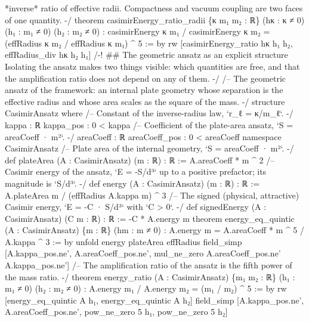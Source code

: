 \documentclass[11pt,a4paper]{article}
\begin{document}
{*inverse* ratio of effective radii.  Compactness and vacuum coupling are two
faces of one quantity. -/
theorem casimirEnergy\_\allowbreak{}ratio\_\allowbreak{}radii \{κ m₁ m₂ : ℝ\} (hκ : κ ≠ 0) (h₁ : m₁ ≠ 0) (h₂ : m₂ ≠ 0) :
    casimirEnergy κ m₁ / casimirEnergy κ m₂ = (effRadius κ m₂ / effRadius κ m₁) \textasciicircum{} 5 := by
  rw [casimirEnergy\_\allowbreak{}ratio hκ h₁ h₂, effRadius\_\allowbreak{}div hκ h₂ h₁]
\mbox{}
/-! \#\# The geometric ansatz as an explicit structure
\mbox{}
Isolating the ansatz makes two things visible: which quantities are free, and
that the amplification ratio does not depend on any of them.
-/
\mbox{}
/-- The geometric ansatz of the framework: an internal plate geometry whose
separation is the effective radius and whose area scales as the square of the
mass. -/
structure CasimirAnsatz where
  /-- Constant of the inverse-radius law, `r\_\allowbreak{}ℓ = κ/m\_\allowbreak{}ℓ`. -/
  kappa : ℝ
  kappa\_\allowbreak{}pos : 0 \textless{} kappa
  /-- Coefficient of the plate-area ansatz, `S = areaCoeff · m²`. -/
  areaCoeff : ℝ
  areaCoeff\_\allowbreak{}pos : 0 \textless{} areaCoeff
\mbox{}
namespace CasimirAnsatz
\mbox{}
/-- Plate area of the internal geometry, `S = areaCoeff · m²`. -/
def plateArea (A : CasimirAnsatz) (m : ℝ) : ℝ := A.areaCoeff * m \textasciicircum{} 2
\mbox{}
/-- Casimir energy of the ansatz, `E = -S/d³` up to a positive prefactor;
its magnitude is `S/d³`. -/
def energy (A : CasimirAnsatz) (m : ℝ) : ℝ := A.plateArea m / (effRadius A.kappa m) \textasciicircum{} 3
\mbox{}
/-- The signed (physical, attractive) Casimir energy, `E = -C · S/d³` with `C \textgreater{} 0`. -/
def signedEnergy (A : CasimirAnsatz) (C m : ℝ) : ℝ := -C * A.energy m
\mbox{}
theorem energy\_\allowbreak{}eq\_\allowbreak{}quintic (A : CasimirAnsatz) \{m : ℝ\} (hm : m ≠ 0) :
    A.energy m = A.areaCoeff * m \textasciicircum{} 5 / A.kappa \textasciicircum{} 3 := by
  unfold energy plateArea effRadius
  field\_\allowbreak{}simp [A.kappa\_\allowbreak{}pos.ne', A.areaCoeff\_\allowbreak{}pos.ne',
    mul\_\allowbreak{}ne\_\allowbreak{}zero A.areaCoeff\_\allowbreak{}pos.ne' A.kappa\_\allowbreak{}pos.ne']
\mbox{}
/-- The amplification ratio of the ansatz is the fifth power of the mass ratio. -/
theorem energy\_\allowbreak{}ratio (A : CasimirAnsatz) \{m₁ m₂ : ℝ\} (h₁ : m₁ ≠ 0) (h₂ : m₂ ≠ 0) :
    A.energy m₁ / A.energy m₂ = (m₁ / m₂) \textasciicircum{} 5 := by
  rw [energy\_\allowbreak{}eq\_\allowbreak{}quintic A h₁, energy\_\allowbreak{}eq\_\allowbreak{}quintic A h₂]
  field\_\allowbreak{}simp [A.kappa\_\allowbreak{}pos.ne', A.areaCoeff\_\allowbreak{}pos.ne', pow\_\allowbreak{}ne\_\allowbreak{}zero 5 h₁, pow\_\allowbreak{}ne\_\allowbreak{}zero 5 h₂]
}
\end{document}
